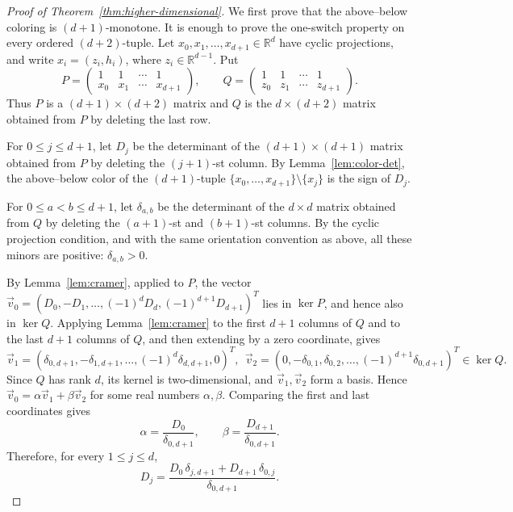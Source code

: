 \documentclass[10pt,a4paper]{amsart}
\begin{document}
\begin{proof}[Proof of Theorem~\ref{thm:higher-dimensional}]
We first prove that the above--below coloring is $(d+1)$-monotone. It is enough to prove the one-switch property on every ordered $(d+2)$-tuple. Let $x_0,x_1,\ldots,x_{d+1}\in\mathbb R^d$ have cyclic projections, and write $x_i=(z_i,h_i)$, where
$z_i\in\mathbb R^{d-1}$. Put
\[
P=
\begin{pmatrix}
1&1&\cdots&1\\
x_0&x_1&\cdots&x_{d+1}
\end{pmatrix},
\qquad
Q=
\begin{pmatrix}
1&1&\cdots&1\\
z_0&z_1&\cdots&z_{d+1}
\end{pmatrix}.
\]
Thus $P$ is a $(d+1)\times(d+2)$ matrix and $Q$ is the $d\times(d+2)$ matrix
obtained from $P$ by deleting the last row.

For $0\le j\le d+1$, let $D_j$ be the determinant of the
$(d+1)\times(d+1)$ matrix obtained from $P$ by deleting the $(j+1)$-st column.
By Lemma~\ref{lem:color-det}, the above--below color of the $(d+1)$-tuple $\{x_0,\ldots,x_{d+1}\}\setminus\{x_j\}$ is the sign of $D_j$.

For $0\le a<b\le d+1$, let $\delta_{a,b}$ be the determinant of the
$d\times d$ matrix obtained from $Q$ by deleting the $(a+1)$-st and $(b+1)$-st
columns. By the cyclic projection condition, and with the same orientation
convention as above, all these minors are positive: $\delta_{a,b}>0$.

By Lemma~\ref{lem:cramer}, applied to $P$, the vector $\vec v_0=(D_0,-D_1,\ldots,(-1)^dD_d,(-1)^{d+1}D_{d+1})^T$ lies in $\ker P$, and hence also in $\ker Q$. Applying Lemma~\ref{lem:cramer}
to the first $d+1$ columns of $Q$ and to the last $d+1$ columns of $Q$, and
then extending by a zero coordinate, gives
\[
\vec v_1=(\delta_{0,d+1},-\delta_{1,d+1},\ldots,(-1)^d\delta_{d,d+1},0)^T,\ \ \vec v_2=(0,-\delta_{0,1},\delta_{0,2},\ldots,(-1)^{d+1}\delta_{0,d+1})^T
\in\ker Q.
\]
Since $Q$ has rank $d$, its kernel is two-dimensional, and $\vec v_1,\vec v_2$
form a basis. Hence $\vec v_0=\alpha\vec v_1+\beta\vec v_2$ for some real
numbers $\alpha,\beta$. Comparing the first and last coordinates gives
\[
\alpha=\frac{D_0}{\delta_{0,d+1}},
\qquad
\beta=\frac{D_{d+1}}{\delta_{0,d+1}}.
\]
Therefore, for every $1\le j\le d$,
\begin{equation}\label{eq:Dj-monotone-combination}
D_j
=
\frac{D_0\,\delta_{j,d+1}+D_{d+1}\,\delta_{0,j}}
     {\delta_{0,d+1}}.
\end{equation}


\end{proof}
\end{document}
